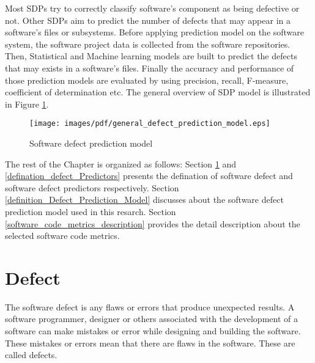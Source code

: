 \documentclass[12pt]{report}
\begin{document}
%

Most SDPs try to correctly classify software's component as being defective or not. Other SDPs aim to predict the number of defects that may appear in a software's files or subsystems. Before applying prediction model on the software system, the software project data is collected from the software repositories. Then, Statistical and Machine learning models are built to predict the defects that may exists in a software's files. Finally the accuracy and performance of those prediction models are evaluated by using precision, recall, F-measure, coefficient of determination etc. The general overview of SDP model is illustrated in Figure \ref{generalized_Defect_Prediction_Model}. 

\begin{figure}[h!]
\center
      \texttt{[image: images/pdf/general\_defect\_prediction\_model.eps]}
		\caption{Software defect prediction model}
		\label{generalized_Defect_Prediction_Model}	
\end{figure}
The rest of the Chapter is organized as follows: Section \ref{defination_defect} and \ref{defination_defect_Predictors} presents the defination of software defect and software defect predictors respectively. Section \ref{definition_Defect_Prediction_Model} discusses about the software defect prediction model used in this resarch. Section \ref{software_code_metrics_description} provides the detail description about the selected software code metrics.  
\section{Defect }
\label{defination_defect}
The software defect is any flaws or errors that produce unexpected results. A software programmer, designer or others associated with the development of a software can make mistakes or error while designing and building the software. These mistakes or errors mean that there are flaws in the software. These are called defects.
\end{document}
